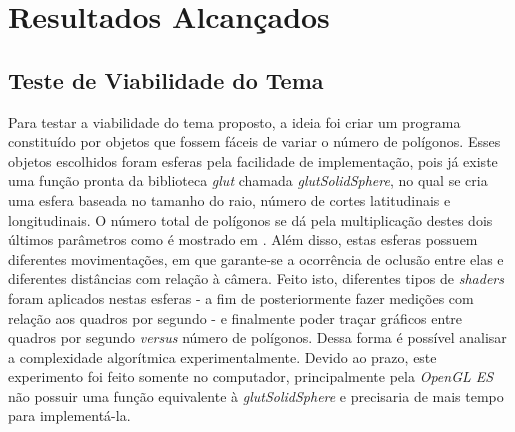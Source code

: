 \chapter[Resultados Alcançados]{Resultados Alcançados}


\section{Teste de Viabilidade do Tema}

	Para testar a viabilidade do tema proposto, a ideia foi criar um programa constituído por objetos que fossem fáceis de variar o número de polígonos. Esses objetos escolhidos foram esferas pela facilidade de implementação, pois já existe uma função pronta da biblioteca \textit{glut} chamada \textit{glutSolidSphere}, no qual se cria uma esfera baseada no tamanho do raio, número de cortes latitudinais e longitudinais. O número total de polígonos se dá pela multiplicação destes dois últimos parâmetros como é mostrado em \cite{poly}.  Além disso, estas esferas possuem diferentes movimentações, em que garante-se a ocorrência de oclusão entre elas e diferentes distâncias com relação à câmera. Feito isto, diferentes tipos de \textit{shaders} foram aplicados nestas esferas - a fim de posteriormente fazer medições com relação aos quadros por segundo - e finalmente poder traçar gráficos entre quadros por segundo \textit{versus} número de polígonos. Dessa forma é possível analisar a complexidade algorítmica experimentalmente. Devido ao prazo, este experimento foi feito somente no computador, principalmente pela \textit{OpenGL ES} não possuir uma função equivalente à \textit{glutSolidSphere} e precisaria de mais tempo para implementá-la. 


